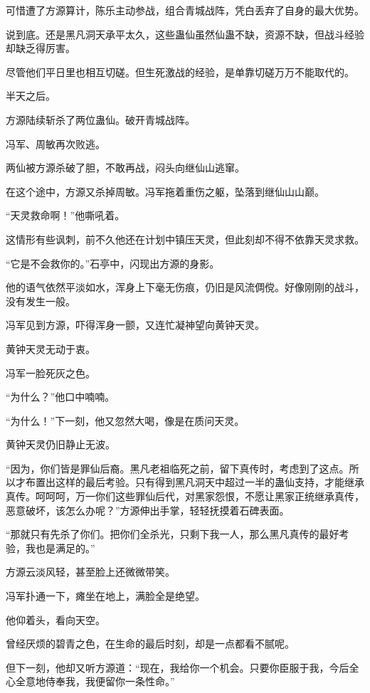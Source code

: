 \begin{this_body}
可惜遭了方源算计，陈乐主动参战，组合青城战阵，凭白丢弃了自身的最大优势。

说到底。还是黑凡洞天承平太久，这些蛊仙虽然仙蛊不缺，资源不缺，但战斗经验却缺乏得厉害。

尽管他们平日里也相互切磋。但生死激战的经验，是单靠切磋万万不能取代的。

半天之后。

方源陆续斩杀了两位蛊仙。破开青城战阵。

冯军、周敏再次败逃。

两仙被方源杀破了胆，不敢再战，闷头向继仙山逃窜。

在这个途中，方源又杀掉周敏。冯军拖着重伤之躯，坠落到继仙山山巅。

“天灵救命啊！”他嘶吼着。

这情形有些讽刺，前不久他还在计划中镇压天灵，但此刻却不得不依靠天灵求救。

“它是不会救你的。”石亭中，闪现出方源的身影。

他的语气依然平淡如水，浑身上下毫无伤痕，仍旧是风流倜傥。好像刚刚的战斗，没有发生一般。

冯军见到方源，吓得浑身一颤，又连忙凝神望向黄钟天灵。

黄钟天灵无动于衷。

冯军一脸死灰之色。

“为什么？”他口中喃喃。

“为什么！”下一刻，他又忽然大喝，像是在质问天灵。

黄钟天灵仍旧静止无波。

“因为，你们皆是罪仙后裔。黑凡老祖临死之前，留下真传时，考虑到了这点。所以才布置出这样的最后考验。只有得到黑凡洞天中超过一半的蛊仙支持，才能继承真传。呵呵呵，万一你们这些罪仙后代，对黑家怨恨，不愿让黑家正统继承真传，恶意破坏，该怎么办呢？”方源伸出手掌，轻轻抚摸着石碑表面。

“那就只有先杀了你们。把你们全杀光，只剩下我一人，那么黑凡真传的最好考验，我也是满足的。”

方源云淡风轻，甚至脸上还微微带笑。

冯军扑通一下，瘫坐在地上，满脸全是绝望。

他仰着头，看向天空。

曾经厌烦的碧青之色，在生命的最后时刻，却是一点都看不腻呢。

但下一刻，他却又听方源道：“现在，我给你一个机会。只要你臣服于我，今后全心全意地侍奉我，我便留你一条性命。”


\end{this_body}
